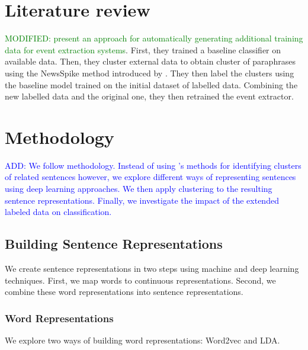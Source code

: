 \documentclass[11pt]{article}
\newcommand\add[1]{{\textcolor{blue}{ADD: #1}}}
\newcommand\mod[1]{{\textcolor{green}{MODIFIED: #1}}}
\begin{document}
\section{Literature review}

\cite{N18-2058} \mod{present an approach for automatically generating additional training data for event extraction systems}. First, they trained a baseline classifier on available data. Then, they cluster external data to obtain cluster of paraphrases using the NewsSpike method introduced by \cite{zhang2015}. They then label the clusters using the baseline model trained on the initial dataset of labelled data. Combining the new labelled data and the original one, they then retrained the event extractor.

\section{Methodology}

\add{We follow \cite{N18-2058} methodology. Instead of using \cite{zhang2015}'s methods for identifying clusters of related sentences however, we explore different ways of representing sentences using deep learning approaches. We then apply clustering to the resulting sentence representations. Finally, we investigate the impact of the extended labeled data on classification. }





\subsection{Building Sentence Representations}

We create sentence representations in two steps using machine and deep learning techniques. First, we map words to continuous representations. Second, we combine these word representations into sentence representations. 

\subsubsection{Word Representations}

We explore two ways of building word representations: Word2vec and LDA.
\end{document}
